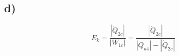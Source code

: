 

\subsection*{d)}

\[
E_k = \frac{|\dot{Q}_{2c}|}{|W_{1c}|} = \frac{|\dot{Q}_{2c}|}{|Q_{a4}| - |\dot{Q}_{2c}|}
\]